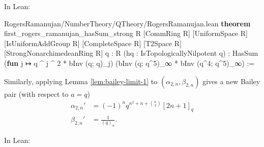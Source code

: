 \documentclass[12pt]{amsart}
\theoremstyle{definition}
\theoremstyle{remark}
\numberwithin{equation}{subsection}
\newcommand{\kw}[1]{\textcolor{keywordcolor}{\textbf{#1}}}
\newcommand{\var}[1]{\textcolor{tacticcolor}{#1}}
\newcommand{\num}[1]{\textcolor{numcolor}{#1}}
\newcommand{\imp}[1]{\textcolor{commentcolor}{\textbraceleft#1\textbraceright}}
\begin{document}
In Lean:

\begin{code}{RogersRamanujan/NumberTheory/QTheory/RogersRamanujan.lean}
\kw{theorem} first_rogers_ramanujan_hasSum_strong \imp{R} [CommRing \var{R}] [UniformSpace \var{R}]
  [IsUniformAddGroup \var{R}] [CompleteSpace \var{R}] [T2Space \var{R}] [StrongNonarchimedeanRing \var{R}]
  \imp{q : R} (\var{hq} : IsTopologicallyNilpotent \var{q}) :
  HasSum (\kw{fun} \var{j} ↦ \var{q} ^ \var{j} ^ \num{2} * bInv (\var{q}; \var{q})_\var{j}) (bInv (\var{q}; \var{q}^\num{5})_∞ * bInv (\var{q}^\num{4}; \var{q}^\num{5})_∞) :=
\end{code}

Similarly, applying Lemma \ref{lem:bailey-limit-1} to $(\alpha_{2,n},\beta_{2,n})$ gives a new Bailey pair (with respect to $a = q$)
\begin{align}
    \alpha_{2,n}' &= (-1)^n q^{n^2 + n + \binom{n}{2}} [2n+1]_q \\
    \beta_{2,n}' &= \frac{1}{(q)_n}.
\end{align}

In Lean:
\end{document}
